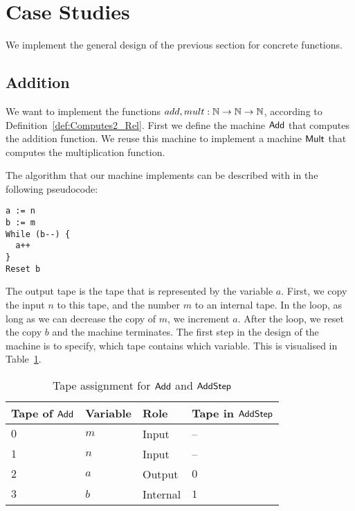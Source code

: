 \section{Case Studies}
\label{sec:case-studies}

We implement the general design of the previous section for concrete functions.

\subsection{Addition}
\label{sec:Add}

We want to implement the functions $add,mult:\mathbb{N}\rightarrow\mathbb{N}\rightarrow\mathbb{N}$, according to Definition~\ref{def:Computes2_Rel}.  First we define the machine
$\mathsf{Add}$ that computes the addition function.  We reuse this machine to implement a machine $\mathsf{Mult}$ that computes the multiplication function.

The algorithm that our machine implements can be described with in the following pseudocode:
{
  \small
\begin{lstlisting}[style=pseudocode]
a := n
b := m
While (b--) {
  a++
}
Reset b
\end{lstlisting}
}%
The output tape is the tape that is represented by the variable $a$.  First, we copy the input $n$ to this tape, and the number $m$ to an internal
tape.  In the loop, as long as we can decrease the copy of $m$, we increment $a$.  After the loop, we reset the copy $b$ and the machine terminates.
The first step in the design of the machine is to specify, which tape contains which variable.  This is visualised in Table~\ref{tab:tapes-Add}.

\begin{table}[h]
  \centering
  \begin{tabular}{l|l|l|l}
     Tape of $\mathsf{Add}$ & Variable & Role      & Tape in $\mathsf{AddStep}$ \\ \hline
     $0$                & $m$      & Input     & --                     \\
     $1$                & $n$      & Input     & --                     \\
     $2$                & $a$      & Output    & $0$                    \\
     $3$                & $b$      & Internal  & $1$                    \\
  \end{tabular}
  \caption{Tape assignment for $\mathsf{Add}$ and $\mathsf{AddStep}$}
  \label{tab:tapes-Add}
\end{table}

